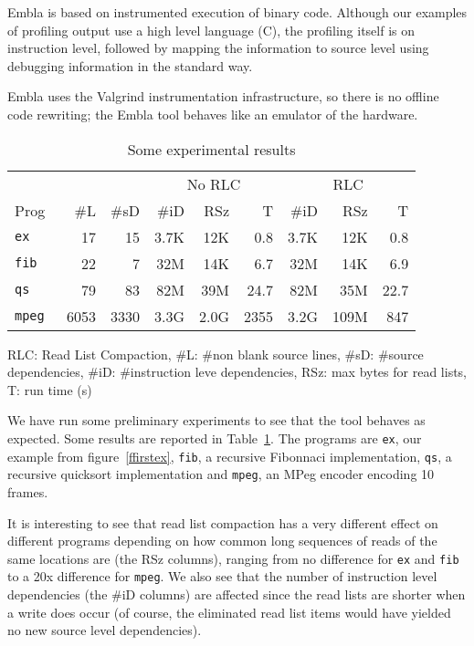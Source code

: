 \documentclass{acm_proc_article-sp}
\begin{document}
Embla is based on instrumented execution of binary code. Although
our examples of profiling output use a high level language (C),
the profiling itself is on instruction level, followed by 
mapping the information to source level using debugging information 
in the standard way.

Embla uses the Valgrind instrumentation infrastructure, so there
is no offline code rewriting; the Embla tool behaves like an emulator
of the hardware.

\begin{table}
\begin{center} \newcommand{\sms}{\hskip0.4em}
\begin{tabular}{|@{\sms}l@{\sms}|r@{\sms}r|r@{\sms}r@{\sms}r|r@{\sms}r@{\sms}r|} \hline
 & & & \multicolumn{3}{|c|}{No RLC} & 
\multicolumn{3}{c|}{RLC} \\
Prog & \#L & \#sD & \#iD & RSz & T 
                              & \#iD & RSz & T \\ \hline
\tt ex & 17 & 15 & 3.7K & 12K & 0.8 & 3.7K & 12K & 0.8 \\
\tt fib & 22 & 7 & 32M & 14K & 6.7 & 32M & 14K & 6.9 \\
\tt qs & 79 & 83 & 82M & 39M & 24.7 & 82M & 35M & 22.7 \\
\tt mpeg & 6053 & 3330 & 3.3G & 2.0G & 2355 & 3.2G & 109M & 847 \\ \hline
\end{tabular}
\end{center}
RLC: Read List Compaction, 
\#L: \#non blank source lines, \#sD: \#source dependencies, \#iD: 
\#instruction
leve dependencies, RSz: max bytes for read lists, T: run time (s)
\caption{Some experimental results} \label{trex}
\end{table}

We have run some preliminary experiments to see that the tool behaves as
expected. Some results are reported in Table~\ref{trex}. The programs are 
{\tt ex}, our example from figure~\ref{ffirstex}, {\tt fib}, a recursive
Fibonnaci implementation, {\tt qs}, a recursive quicksort implementation 
and {\tt mpeg}, an MPeg encoder encoding 10 frames.

It is interesting
to see that read list compaction has a very different effect on different 
programs depending on how common long sequences of reads of the same 
locations are (the RSz columns), ranging from no difference for {\tt ex} and 
{\tt fib} to a 20x difference for {\tt mpeg}. We also see that the number of 
instruction 
level dependencies (the \#iD columns) are affected since the read lists 
are shorter when a write does occur (of course, the eliminated read list 
items would have yielded no new source level dependencies).
\end{document}
